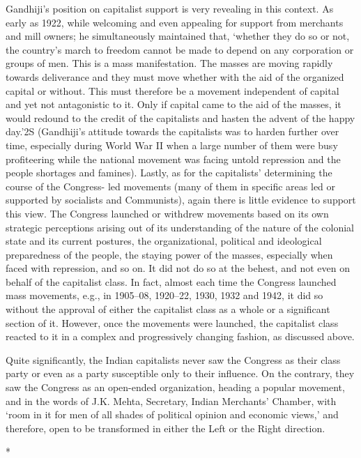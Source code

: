 Gandhiji's position on capitalist support is very revealing in this context. As early as 1922, while welcoming and even appealing for support from merchants and mill owners; he simultaneously maintained that, `whether they do so or not, the country's march to freedom cannot be made to depend on any corporation or groups of men. This is a mass manifestation. The masses are moving rapidly towards deliverance and they must move whether with the aid of the organized capital or without. This must therefore be a movement independent of capital and yet not antagonistic to it. Only if capital came to the aid of the masses, it would redound to the credit of the capitalists and hasten the advent of the happy day.'2S (Gandhiji's attitude towards the capitalists was to harden further over time, especially during World War II when a large number of them were busy profiteering while the national movement was facing untold repression and the people shortages and famines). Lastly, as for the capitalists' determining the course of the Congress- led movements (many of them in specific areas led or supported by socialists and Communists), again there is little evidence to support this view. The Congress launched or withdrew movements based on its own strategic perceptions arising out of its understanding of the nature of the colonial state and its current postures, the organizational, political and ideological preparedness of the people, the staying power of the masses, especially when faced with repression, and so on. It did not do so at the behest, and not even on behalf of the capitalist class. In fact, almost each time the Congress launched mass movements, e.g., in 1905--08, 1920--22, 1930, 1932 and 1942, it did so without the approval of either the capitalist class as a whole or a significant section of it. However, once the movements were launched, the capitalist class reacted to it in a complex and progressively changing fashion, as discussed above. 

Quite significantly, the Indian capitalists never saw the Congress as their class party or even as a party susceptible only to their influence. On the contrary, they saw the Congress as an open-ended organization, heading a popular movement, and in the words of J.K. Mehta, Secretary, Indian Merchants' Chamber, with `room in it for men of all shades of political opinion and economic views,' and therefore, open to be transformed in either the Left or the Right direction.

\begin{center}*\end{center}


